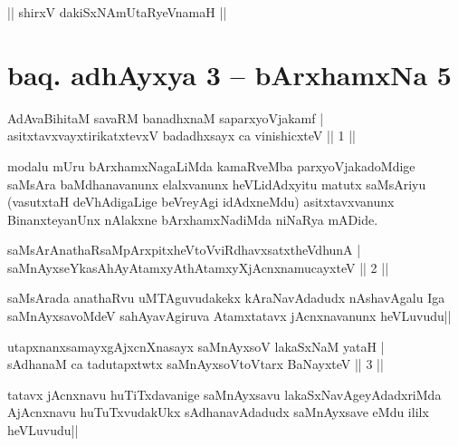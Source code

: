 \begin{center}
|| shirxV dakiSxNAmUtaRyeVnamaH ||
\end{center}

\section*{baq. adhAyxya 3 -- bArxhamxNa 5}

\begin{shl}
AdAvaBihitaM savaRM banadhxnaM saparxyoVjakamf |\\
asitxtavxvayxtirikatxtevxV badadhxsayx ca vinishicxteV \hfill || 1 ||
\end{shl}

\begin{artha}%
modalu mUru bArxhamxNagaLiMda kamaRveMba parxyoVjakadoMdige saMsAra baMdhanavanunx elalxvanunx heVLidAdxyitu matutx saMsAriyu (vasutxtaH deVhAdigaLige beVreyAgi idAdxneMdu) asitxtavxvanunx BinanxteyanUnx nAlakxne bArxhamxNadiMda niNaRya mADide.
\end{artha}


\begin{shl}
saMsArAnathaRsaMpArxpitxheVtoVviRdhavxsatxtheV\s dhunA |\\
saMnAyxseYkasAhAyAtamxyAthAtamxyXjAcnxnamucayxteV \hfill || 2 ||
\end{shl}

\begin{artha}
saMsArada anathaRvu uMTAguvudakekx kAraNavAdadudx nAshavAgalu Iga saMnAyxsavoMdeV sahAyavAgiruva Atamxtatavx jAcnxnavanunx heVLuvudu||
\end{artha}


\begin{shl}
utapxnanxsamayxgAjxcnXnasayx saMnAyxsoV lakaSxNaM yataH |\\
sAdhanaM ca tadutapxtwtx saMnAyxsoV\s toV\s tarx BaNayxteV \hfill || 3 ||
\end{shl}

\begin{artha}
tatavx jAcnxnavu huTiTxdavanige saMnAyxsavu lakaSxNavAgeyAdadxriMda AjAcnxnavu huTuTxvudakUkx sAdhanavAdadudx saMnAyxsave eMdu ililx heVLuvudu||
\end{artha}


